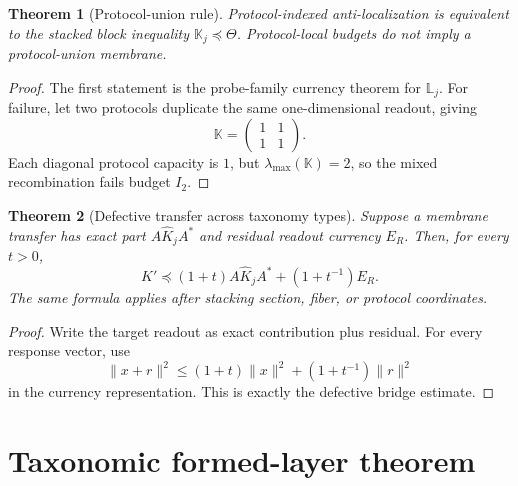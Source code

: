 \documentclass[11pt]{article}
\newtheorem{theorem}{Theorem}[section]
\begin{document}
\begin{theorem}[Protocol-union rule]\label{thm:protocol-union}
Protocol-indexed anti-localization is equivalent to the stacked block inequality \(\mathbb K_j\preceq\mathbb\Theta\). Protocol-local budgets do not imply a protocol-union membrane.
\end{theorem}
\begin{proof}
The first statement is the probe-family currency theorem for \(\mathbb L_j\). For failure, let two protocols duplicate the same one-dimensional readout, giving
\[
  \mathbb K=\begin{pmatrix}1&1\\1&1\end{pmatrix}.
\]
Each diagonal protocol capacity is \(1\), but \(\lambda_{\max}(\mathbb K)=2\), so the mixed recombination fails budget \(I_2\).
\end{proof}

\begin{theorem}[Defective transfer across taxonomy types]\label{thm:defective-transfer}
Suppose a membrane transfer has exact part \(A\widehat K_jA^*\) and residual readout currency \(E_R\). Then, for every \(t>0\),
\[
  K'\preceq(1+t)A\widehat K_jA^*+(1+t^{-1})E_R.
\]
The same formula applies after stacking section, fiber, or protocol coordinates.
\end{theorem}
\begin{proof}
Write the target readout as exact contribution plus residual. For every response vector, use
\[
 \|x+r\|^2\le(1+t)\|x\|^2+(1+t^{-1})\|r\|^2
\]
in the currency representation. This is exactly the defective bridge estimate.
\end{proof}

\section{Taxonomic formed-layer theorem}
\end{document}
